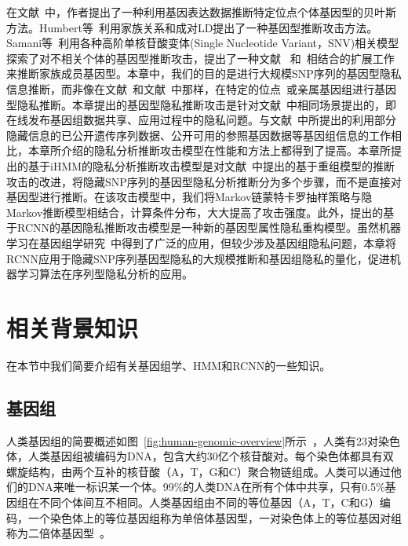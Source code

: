 在文献~\cite{schadt2012bayesian}中，作者提出了一种利用基因表达数据推断特定位点个体基因型的贝叶斯方法。Humbert等~\cite{humbert2013addressing}利用家族关系和成对LD提出了一种基因型推断攻击方法。Samani等~\cite{samani2015quantifying}利用各种高阶单核苷酸变体(Single Nucleotide Variant，SNV)相关模型探索了对不相关个体的基因型推断攻击，提出了一种文献~\cite{humbert2013addressing} 和~\cite{deznabi2018inference}相结合的扩展工作来推断家族成员基因型。本章中，我们的目的是进行大规模SNP序列的基因型隐私信息推断，而非像在文献~\cite{humbert2013addressing}和文献~\cite{deznabi2018inference}中那样，在特定的位点~\cite{schadt2012bayesian}或亲属基因组进行基因型隐私推断。本章提出的基因型隐私推断攻击是针对文献~\cite{samani2015quantifying}中相同场景提出的，即在线发布基因组数据共享、应用过程中的隐私问题。与文献~\cite{samani2015quantifying}中所提出的利用部分隐藏信息的已公开遗传序列数据、公开可用的参照基因数据等基因组信息的工作相比，本章所介绍的隐私分析推断攻击模型在性能和方法上都得到了提高。本章所提出的基于iHMM的隐私分析推断攻击模型是对文献~\cite{samani2015quantifying}中提出的基于重组模型的推断攻击的改进，将隐藏SNP序列的基因型隐私分析推断分为多个步骤，而不是直接对基因型进行推断。在该攻击模型中，我们将Markov链蒙特卡罗抽样策略与隐Markov推断模型相结合，计算条件分布，大大提高了攻击强度。此外，提出的基于RCNN的基因隐私推断攻击模型是一种新的基因型属性隐私重构模型。虽然机器学习在基因组学研究~\cite{libbrecht2015machine}中得到了广泛的应用，但较少涉及基因组隐私问题，本章将RCNN应用于隐藏SNP序列基因型隐私的大规模推断和基因组隐私的量化，促进机器学习算法在序列型隐私分析的应用。


\section{相关背景知识}\label{sec:back}

在本节中我们简要介绍有关基因组学、HMM和RCNN的一些知识。

\subsection{基因组}
人类基因组的简要概述如图~\ref{fig:human-genomic-overview}所示~\cite{samani2015quantifying}，人类有23对染色体，人类基因组被编码为DNA，包含大约30亿个核苷酸对。每个染色体都具有双螺旋结构，由两个互补的核苷酸（A，T，G和C）聚合物链组成。人类可以通过他们的DNA来唯一标识某一个体。99\%的人类DNA在所有个体中共享，只有0.5\%基因组在不同个体间互不相同。人类基因组由不同的等位基因（A，T，C和G）编码，一个染色体上的等位基因组称为单倍体基因型，一对染色体上的等位基因对组称为二倍体基因型~\cite{durbin1998biological}。

